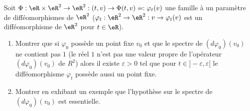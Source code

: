 
\begin{exercice}\label{exoImplicite0009}

Soit $\Phi:\eR \times \eR^2 \rightarrow \eR^2 : (t,v) \rightarrow \Phi(t,v) =:
\varphi_t(v)$ une famille à un paramètre de difféomorphismes de $\eR^2$
($\varphi_t : \eR^2 \rightarrow \eR^2 : v \rightarrow \varphi_t(v)$ est un
difféomorphisme de $\eR^2$ pour $t \in \eR$).
\begin{enumerate}
\item
Montrer que si $\varphi_0$ possède un point fixe $v_0$ et que le spectre
de $(d\varphi_0)(v_0)$ ne contient pas $1$ (le réel $1$ n'est pas une
valeur propre de l'opérateur $(d\varphi_0)(v_0)$ de $R^2$) alors il
existe $\varepsilon > 0$ tel que pour $t \in ]-\varepsilon, \varepsilon[$
le difféomorphisme $\varphi_t$ possède aussi un point fixe.
\item
Montrer en exhibant un exemple que l'hypothèse sur le spectre de
$(d\varphi_0)(v_0)$ est essentielle.
\end{enumerate}


\end{exercice}
